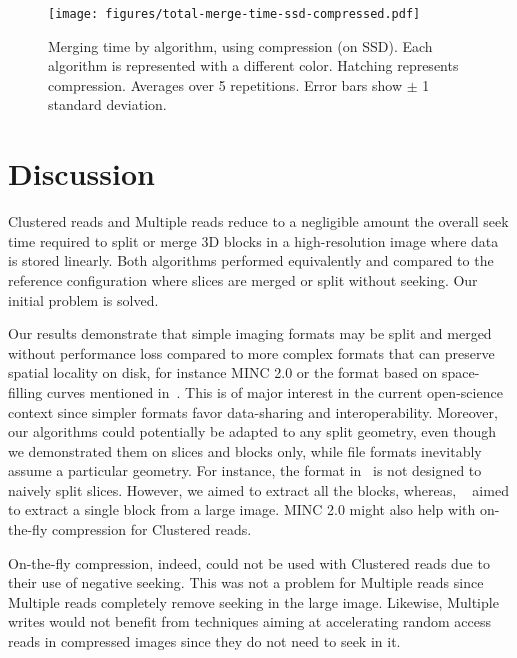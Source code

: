 \documentclass[10pt, conference, compsocconf]{IEEEtran}
\begin{document}
\begin{figure}[h]
  \centering
  \texttt{[image: figures/total-merge-time-ssd-compressed.pdf]}
  \hfill
  \caption{Merging time by algorithm, using compression (on SSD). Each
    algorithm is represented with a different color. Hatching
    represents compression. Averages over 5 repetitions. Error bars
    show $\pm$ 1 standard deviation. }
\label{fig:compression}
\end{figure}

\section{Discussion}
\label{sec:discussion}

Clustered reads and Multiple reads reduce to a negligible
amount the overall seek time required to split or merge 3D blocks in a
high-resolution image where data is stored linearly. Both algorithms
performed equivalently and compared to the reference
configuration where slices are merged or split without seeking. Our
initial problem is solved.



Our results demonstrate that simple imaging
formats may be split and merged without performance loss compared to
more complex formats that can preserve spatial locality on disk,
for instance MINC 2.0 or the format based on space-filling curves
mentioned in~\cite{burns2013open}. This is of major interest in the
current open-science context since simpler formats favor data-sharing
and interoperability.  Moreover, our algorithms could potentially be
adapted to any split geometry, even though we demonstrated them on
slices and blocks only, while file formats inevitably assume a
particular geometry. For instance, the format in~\cite{burns2013open}
is not designed to naively split slices. However, we aimed to extract
all the blocks, whereas, ~\cite{burns2013open} aimed to extract a
single block from a large image. MINC 2.0 might also help with
on-the-fly compression for Clustered reads.

On-the-fly compression, indeed, could not be used with Clustered reads
due to their use of negative seeking. This was not a problem for
Multiple reads since Multiple reads completely remove seeking in the
large image. Likewise, Multiple writes would not benefit from
techniques aiming at accelerating random access reads in compressed
images since they do not need to seek in it. 
\end{document}
